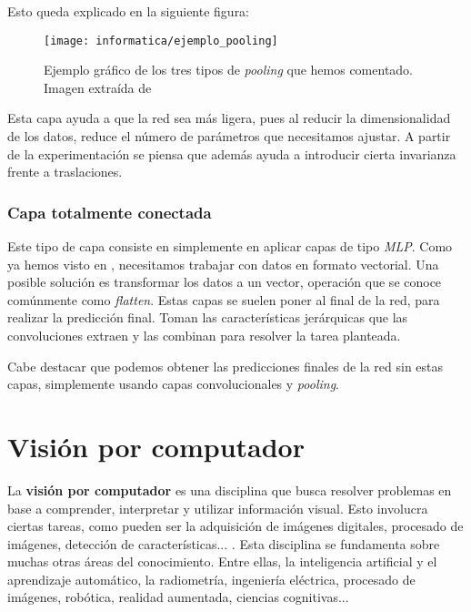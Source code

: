 Esto queda explicado en la siguiente figura:

\begin{figure}[H]
    \centering
    \texttt{[image: informatica/ejemplo\_pooling]}
    \caption{Ejemplo gráfico de los tres tipos de \textit{pooling} que hemos comentado. Imagen extraída de \cite{informatica:paper_definicion_cnn}}
\end{figure}

Esta capa ayuda a que la red sea más ligera, pues al reducir la dimensionalidad de los datos, reduce el número de parámetros que necesitamos ajustar. A partir de la experimentación se piensa que además ayuda a introducir cierta invarianza frente a traslaciones.

\subsubsection{Capa totalmente conectada}

Este tipo de capa consiste en simplemente en aplicar capas de tipo \textit{MLP}. Como ya hemos visto en , necesitamos trabajar con datos en formato vectorial. Una posible solución es transformar los datos a un vector, operación que se conoce comúnmente como \textit{flatten}. Estas capas se suelen poner al final de la red, para realizar la predicción final. Toman las características jerárquicas que las convoluciones extraen y las combinan para resolver la tarea planteada.

Cabe destacar que podemos obtener las predicciones finales de la red sin estas capas, simplemente usando capas convolucionales y \textit{pooling}.

\section{Visión por computador}

La \textbf{visión por computador} es una disciplina que busca resolver problemas en base a comprender, interpretar y utilizar información visual. Esto involucra ciertas tareas, como pueden ser la adquisición de imágenes digitales, procesado de imágenes, detección de características... \cite{informatica:cv_modern_approach}. Esta disciplina se fundamenta sobre muchas otras áreas del conocimiento. Entre ellas, la inteligencia artificial y el aprendizaje automático, la radiometría, ingeniería eléctrica, procesado de imágenes, robótica, realidad aumentada, ciencias cognitivas...

